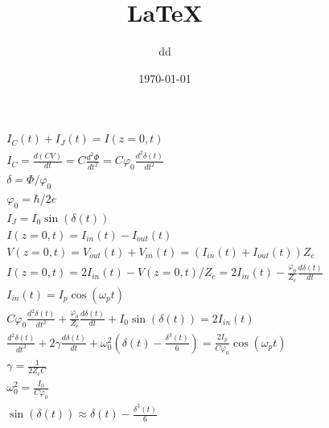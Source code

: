 \documentclass{article}
\title{\LaTeX}
\author{dd}
\date{\today}
\begin{document}
\begin{gather}
	I_C(t)+I_J(t)=I(z=0,t)\\
	I_C=\frac{d(CV)}{dt}=C\frac{d^2\Phi}{dt^2}=C\varphi_0\frac{d^2\delta(t)}{dt^2}\\
	\delta=\Phi/\varphi_0\\
	\varphi_0=\hbar/2e\\
	I_J=I_0\sin(\delta(t))\\
	I(z=0,t)=I_{in}(t)-I_{out}(t)\\
	V(z=0,t)=V_{out}(t)+V_{in}(t)=(I_{in}(t)+I_{out}(t))Z_c\\
	I(z=0,t)=2I_{in}(t)-V(z=0,t)/Z_c=2I_{in}(t)-\frac{\varphi_0}{Z_c}\frac{d \delta(t)}{dt}\\
	I_{in}(t)=I_p\cos(\omega_pt)\\
	C\varphi_0\frac{d^2\delta(t)}{dt^2}+\frac{\varphi_0}{Z_c}\frac{d\delta(t)}{dt}+I_0\sin(\delta(t))=2I_{in}(t)\\
	\frac{d^2\delta(t)}{dt^2}+2\gamma\frac{d \delta(t)}{dt}+\omega^2_0(\delta(t)-\frac{\delta^3(t)}{6})=\frac{2I_p}{C \varphi_0}\cos(\omega_pt)\\
	\gamma=\frac{1}{2Z_cC}\\
	\omega_0^2=\frac{I_0}{C\varphi_0}\\
	\sin(\delta(t))\approx \delta(t)-\frac{\delta^3(t)}{6}\\
\end{gather}
\end{document}
